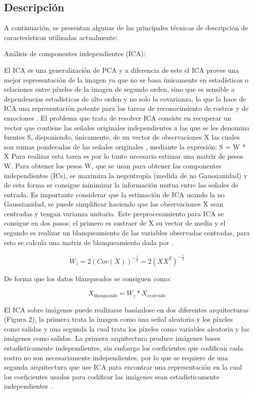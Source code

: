 \subsection{Descripción}
A continuación, se presentan algunas de las principales técnicas de descripción de características utilizadas actualmente:

\begin{enumerate}
{\bf\item Análisis de componentes independientes (ICA):} \vskip 0.1cm
El ICA es una generalización de PCA y a diferencia de este el ICA provee una mejor representación de la imagen ya que no se basa únicamente en estadísticas o relaciones entre píxeles de la imagen de segundo orden, sino que es sensible a dependencias estadísticas de alto orden y no solo la covarianza, lo que la hace de ICA una representación potente para las tareas de reconocimiento de rostros y de emociones \citep{Willian}. 
\vskip 0.1cm
El problema que trata de resolver ICA consiste en recuperar un vector que contiene las señales originales independientes a las que se les denomina fuentes S, disponiendo, únicamente, de un vector de observaciones X las cuales son sumas ponderadas de las señales originales \citep{Damian}, mediante la expresión:  S = W * X
\vskip 0.1cm
Para realizar esta tarea es por lo tanto necesario estimar una matriz de pesos W. Para obtener los pesos W, que se usan para obtener las componentes independientes (ICs), se maximiza la negentropía (medida de no Gaussianidad) y de esta forma se consigue minimizar la información mutua entre las señales de entrada. Es importante considerar que la estimación de ICA usando la no Gaussianidad, se puede simplificar haciendo que las observaciones X sean centradas y tengan varianza unitaria. Este preprocesamiento para ICA se consigue en dos pasos: el primero es sustraer de X su vector de media y el segundo es realizar un blanqueamiento de las variables observadas centradas, para esto se calcula una matriz de blanqueamiento dada por \citep{Damian}.

\begin{equation}
W_{z}={2(Cov(X))}^{-\frac{1}{2}}=2(XX^{T})^{-\frac{1}{2}}
\end{equation}

De forma que los datos blanqueados se consiguen como:

\begin{equation}
X_{blanqueado}=W_{z}*X_{centrado}
\end{equation}

El ICA sobre imágenes puede realizarse basándose en dos diferentes arquitecturas (Figura 2), la primera trata la imagen como una señal aleatoria y los píxeles como salidas y una segunda la cual trata los píxeles como variables aleatoria y las imágenes como salidas. La primera arquitectura produce imágenes bases estadísticamente independientes, sin embargo los coeficientes que codifican cada rostro no son necesariamente independientes, por lo que se requiere de una segunda arquitectura que use ICA para encontrar una representación en la cual los coeficientes usados para codificar las imágenes sean estadísticamente independientes \citep{Willian}.


\end{enumerate}
